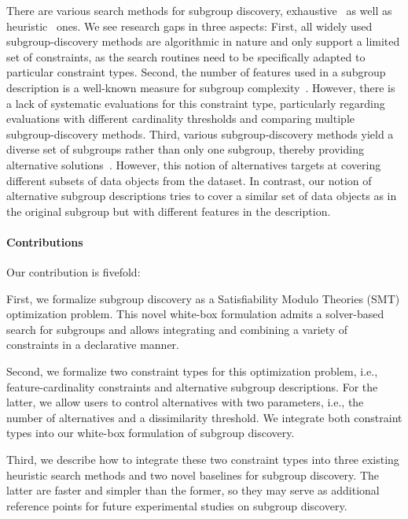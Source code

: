 \documentclass{article}
\theoremstyle{definition}
\begin{document}
There are various search methods for subgroup discovery, exhaustive~\cite{atzmueller2006sd, bosc2018anytime, grosskreutz2009subgroup, lemmerich2010fast} as well as heuristic~\cite{friedman1999bump, leeuwen2012diverse, mampaey2012efficient, proencca2022robust} ones.
We see research gaps in three aspects:
First, all widely used subgroup-discovery methods are algorithmic in nature and only support a limited set of constraints, as the search routines need to be specifically adapted to particular constraint types.
Second, the number of features used in a subgroup description is a well-known measure for subgroup complexity~\cite{helal2016subgroup, herrera2011overview, ventura2018subgroup}.
However, there is a lack of systematic evaluations for this constraint type, particularly regarding evaluations with different cardinality thresholds and comparing multiple subgroup-discovery methods.
Third, various subgroup-discovery methods yield a diverse set of subgroups rather than only one subgroup, thereby providing alternative solutions~\cite{belfodil2019fssd, bosc2018anytime, leeuwen2012diverse, lemmerich2010fast, lucas2018ssdp+, proencca2022robust}.
However, this notion of alternatives targets at covering different subsets of data objects from the dataset.
In contrast, our notion of alternative subgroup descriptions tries to cover a similar set of data objects as in the original subgroup but with different features in the description.

\paragraph{Contributions}

Our contribution is fivefold:

First, we formalize subgroup discovery as a Satisfiability Modulo Theories (SMT) optimization problem.
This novel white-box formulation admits a solver-based search for subgroups and allows integrating and combining a variety of constraints in a declarative manner.

Second, we formalize two constraint types for this optimization problem, i.e., feature-cardinality constraints and alternative subgroup descriptions.
For the latter, we allow users to control alternatives with two parameters, i.e., the number of alternatives and a dissimilarity threshold.
We integrate both constraint types into our white-box formulation of subgroup discovery.

Third, we describe how to integrate these two constraint types into three existing heuristic search methods and two novel baselines for subgroup discovery.
The latter are faster and simpler than the former, so they may serve as additional reference points for future experimental studies on subgroup discovery.
\end{document}
